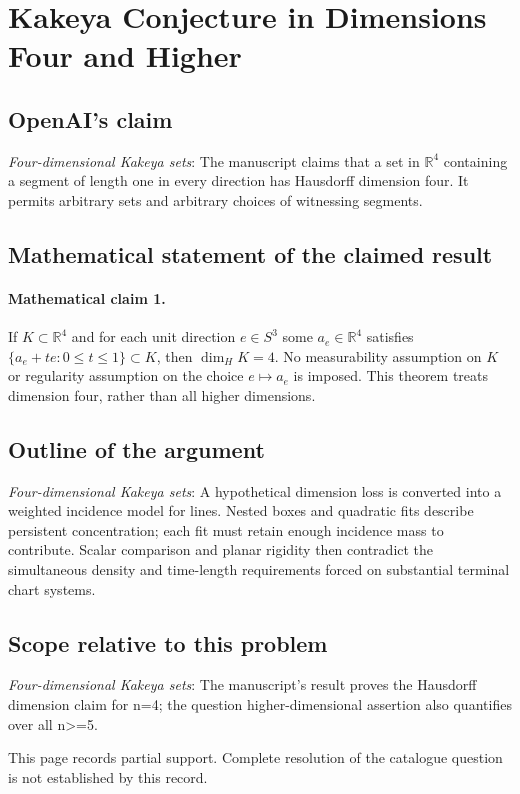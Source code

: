 \documentclass[11pt]{article}
\begin{document}
\section*{Kakeya Conjecture in Dimensions Four and Higher}

\subsection{OpenAI's claim}
\textit{Four-dimensional Kakeya sets}: The manuscript claims that a set in $\mathbb R^4$ containing a segment of length one in every direction has Hausdorff dimension four. It permits arbitrary sets and arbitrary choices of witnessing segments.

\subsection{Mathematical statement of the claimed result}
\paragraph{Mathematical claim 1.} If $K\subset\mathbb R^4$ and for each unit direction $e\in S^3$ some $a_e\in\mathbb R^4$ satisfies $\{a_e+te:0\le t\le1\}\subset K$, then $\dim_H K=4$. No measurability assumption on $K$ or regularity assumption on the choice $e\mapsto a_e$ is imposed. This theorem treats dimension four, rather than all higher dimensions.

\subsection{Outline of the argument}
\textit{Four-dimensional Kakeya sets}: A hypothetical dimension loss is converted into a weighted incidence model for lines. Nested boxes and quadratic fits describe persistent concentration; each fit must retain enough incidence mass to contribute. Scalar comparison and planar rigidity then contradict the simultaneous density and time-length requirements forced on substantial terminal chart systems.

\subsection{Scope relative to this problem}
\textit{Four-dimensional Kakeya sets}: The manuscript’s result proves the Hausdorff dimension claim for n=4; the question higher-dimensional assertion also quantifies over all n>=5.

This page records partial support. Complete resolution of the catalogue question is not established by this record.
\end{document}
